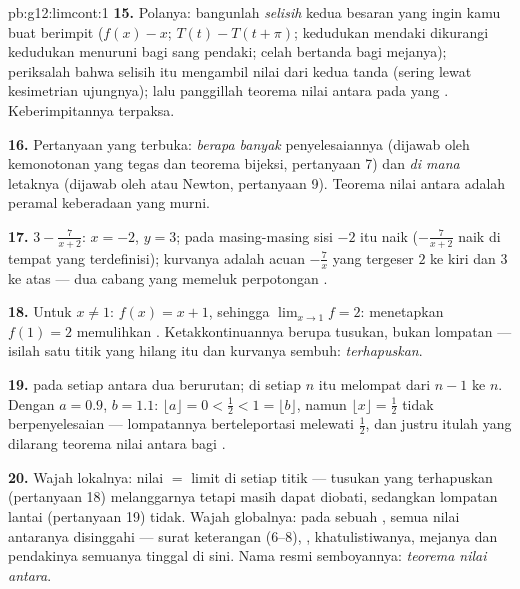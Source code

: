 \begin{solution}{pb:g12:limcont:1}
\textbf{15.} Polanya: bangunlah \emph{selisih} kedua besaran
yang ingin kamu buat berimpit ($f(x) - x$;
$T(t) - T(t + \pi)$; kedudukan mendaki dikurangi kedudukan menuruni bagi
sang pendaki; celah bertanda bagi mejanya); periksalah bahwa selisih itu
mengambil nilai dari kedua tanda (sering lewat kesimetrian ujungnya); lalu
panggillah teorema nilai antara pada  yang . Keberimpitannya terpaksa.

\textbf{16.} Pertanyaan yang terbuka: \emph{berapa banyak} penyelesaiannya
(dijawab oleh kemonotonan yang tegas dan teorema bijeksi,
pertanyaan 7) dan \emph{di mana} letaknya (dijawab oleh 
atau Newton, pertanyaan 9). Teorema nilai antara adalah peramal keberadaan yang murni.

\textbf{17.} $3 - \frac{7}{x + 2}$: 
$x = -2$,  $y = 3$; pada masing-masing sisi $-2$ 
itu naik ($-\frac{7}{x+2}$ naik di tempat yang terdefinisi); kurvanya adalah
 acuan $-\frac7x$ yang tergeser $2$ ke kiri dan $3$ ke atas ---
dua cabang yang memeluk perpotongan .

\textbf{18.} Untuk $x \neq 1$: $f(x) = x + 1$, sehingga
$\lim_{x \to 1} f = 2$: menetapkan $f(1) = 2$ memulihkan
. Ketakkontinuannya berupa tusukan, bukan lompatan ---
isilah satu titik yang hilang itu dan kurvanya sembuh:
\emph{terhapuskan}.

\textbf{19.}  pada setiap  antara dua 
berurutan; di setiap  $n$  itu melompat dari $n - 1$ ke $n$.
Dengan $a = 0.9$, $b = 1.1$: $\lfloor a \rfloor = 0 < \frac12 <
1 = \lfloor b \rfloor$, namun $\lfloor x \rfloor = \frac12$
tidak berpenyelesaian --- lompatannya berteleportasi melewati $\frac12$,
dan justru itulah yang dilarang teorema nilai antara bagi  .

\textbf{20.} Wajah lokalnya: nilai $=$ limit di setiap titik ---
tusukan yang terhapuskan (pertanyaan 18) melanggarnya tetapi masih dapat
diobati, sedangkan lompatan  lantai (pertanyaan 19) tidak. Wajah
globalnya: pada sebuah , semua nilai antaranya disinggahi --- surat
keterangan  (6--8), , khatulistiwanya, mejanya
dan pendakinya semuanya tinggal di sini. Nama resmi semboyannya:
\emph{teorema nilai antara}.

\end{solution}
